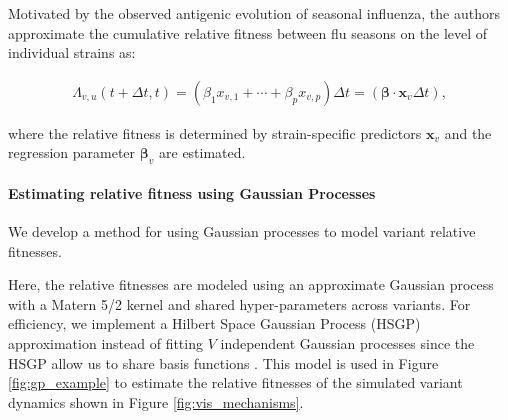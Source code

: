 \documentclass[12pt,oneside,letterpaper]{article}
\renewcommand{\vec}[1]{\boldsymbol{#1}}
\begin{document}
Motivated by the observed antigenic evolution of seasonal influenza, the authors approximate the cumulative relative fitness between flu seasons on the level of individual strains as:

\begin{align*}
    \Lambda_{v,u}(t + \Delta t,t) = (\beta_{1} x_{v,1} + \cdots + \beta_{p} x_{v, p})\Delta t = (\vec{\beta} \cdot \vec{x}_{v} \Delta t),
\end{align*}

where the relative fitness is determined by strain-specific predictors $\vec{x}_{v}$ and the regression parameter $\vec{\beta}_{v}$ are estimated.

\paragraph{Estimating relative fitness using Gaussian Processes}%

We develop a method for using Gaussian processes to model variant relative fitnesses.


Here, the relative fitnesses are modeled using an approximate Gaussian process with a Matern 5/2 kernel and shared hyper-parameters across variants.
For efficiency, we implement a Hilbert Space Gaussian Process (HSGP) approximation instead of fitting $V$ independent Gaussian processes since the HSGP allow us to share basis functions \cite{riutortmayol2022practical}.
This model is used in Figure \ref{fig:gp_example} to estimate the relative fitnesses of the simulated variant dynamics shown in Figure \ref{fig:vis_mechanisms}.
\end{document}

